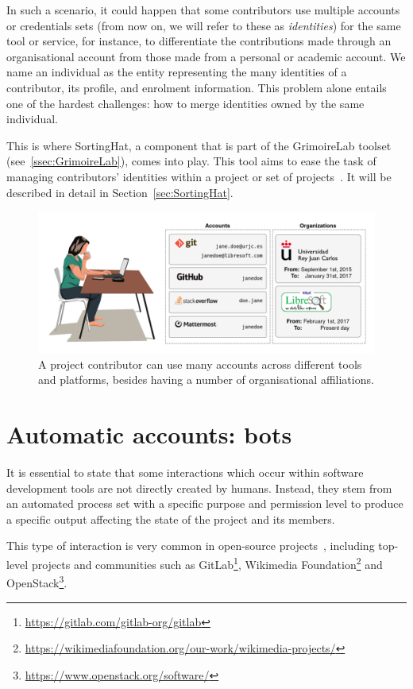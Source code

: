 \documentclass[a4paper, 12pt]{book}
\begin{document}
In such a scenario, it could happen that some contributors use multiple accounts or credentials sets (from now on, we will refer to these as \textit{identities}) for the same tool or service, for instance, to differentiate the contributions made through an organisational account from those made from a personal or academic account. We name an individual as the entity representing the many identities of a contributor, its profile, and enrolment information. This problem alone entails one of the hardest challenges: how to merge identities owned by the same individual.

This is where SortingHat, a component that is part of the GrimoireLab toolset (see~\ref{ssec:GrimoireLab}), comes into play. This tool aims to ease the task of managing contributors' identities within a project or set of projects~\cite{moreno_et_al-sortinghat}. It will be described in detail in Section~\ref{sec:SortingHat}. 

\begin{figure}
 \centering
  \includegraphics[width=16cm, keepaspectratio]{img/example-identity}
  \caption{A project contributor can use many accounts across different tools and platforms, besides having a number of organisational affiliations.}
  \label{fig:example-identity}
\end{figure}

\section{Automatic accounts: bots}
\label{sec:intro-bots}

It is essential to state that some interactions which occur within software development tools are not directly created by humans. Instead, they stem from an automated process set with a specific purpose and permission level to produce a specific output affecting the state of the project and its members.

This type of interaction is very common in open-source projects~\cite{erlenhov-et-al-emprirical-study-bots-oss20}, including top-level projects and communities such as GitLab\footnote{\url{https://gitlab.com/gitlab-org/gitlab}}, Wikimedia Foundation\footnote{\url{https://wikimediafoundation.org/our-work/wikimedia-projects/}} and OpenStack\footnote{\url{https://www.openstack.org/software/}}.
\end{document}
